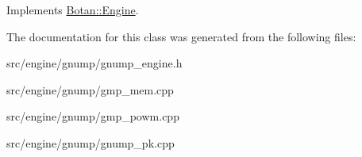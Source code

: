 Implements \hyperlink{classBotan_1_1Engine_a4c2c3ed7b3a2995e6cb8c238346b3a50}{Botan\-::\-Engine}.



The documentation for this class was generated from the following files\-:\begin{DoxyCompactItemize}
\item 
src/engine/gnump/gnump\-\_\-engine.\-h\item 
src/engine/gnump/gmp\-\_\-mem.\-cpp\item 
src/engine/gnump/gmp\-\_\-powm.\-cpp\item 
src/engine/gnump/gnump\-\_\-pk.\-cpp\end{DoxyCompactItemize}
